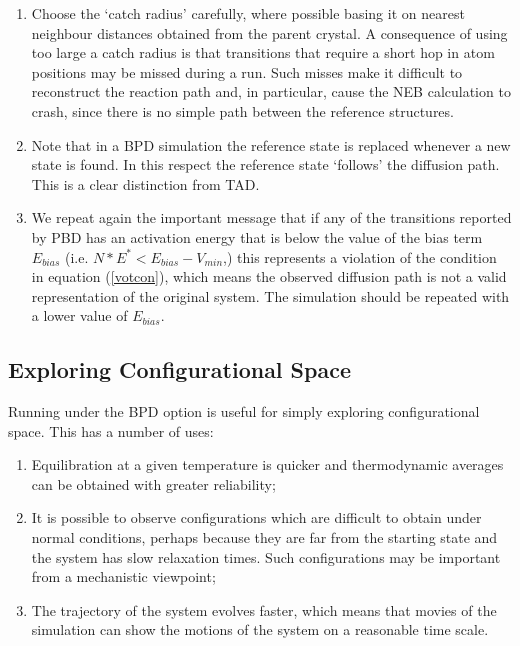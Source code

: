 \begin{enumerate}
\item Choose the `catch radius' carefully, where possible basing it on
  nearest neighbour distances obtained from the parent crystal. A
  consequence of using too large a catch radius is that transitions
  that require a short hop in atom positions may be missed during a
  run. Such misses make it difficult to reconstruct the reaction path
  and, in particular, cause the NEB calculation to crash, since there
  is no simple path between the reference structures.
\item Note that in a BPD simulation the reference state is replaced
  whenever a new state is found. In this respect the reference state
  `follows' the diffusion path. This is a clear distinction from TAD.
\item We repeat again the important message that if any of the 
  transitions reported by PBD has an activation energy that is below
  the value of the bias term $E_{bias}$
  (i.e. $N*E^{*}<E_{bias}-V_{min}$,) this represents a violation of the
  condition in equation (\ref{votcon}), which means the observed
  diffusion path is not a valid representation of the original
  system. The simulation should be repeated with a lower value of
  $E_{bias}$.
\end{enumerate}

\subsection{Exploring Configurational Space}
\label{cfgdyn}
Running \D{} under the BPD option is useful for simply exploring
configurational space. This has a number of uses:
\begin{enumerate}
\item Equilibration at a given temperature is quicker and
 thermodynamic averages can be obtained with greater reliability;
\item It is possible to observe configurations which are
 difficult to obtain under normal conditions, perhaps because they are
 far from the starting state and the system has slow relaxation
 times. Such configurations may be important from a mechanistic
 viewpoint;
\item The trajectory of the system evolves faster, which means that
 movies of the simulation can show the motions of the system on a
 reasonable time scale.
\end{enumerate}

